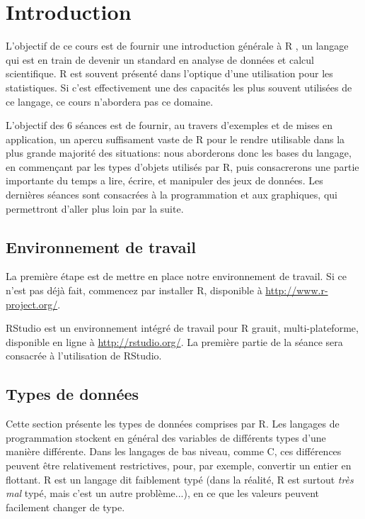 \chapter{Introduction}

L'objectif de ce cours est de fournir une introduction générale à R \parencite{R-Development-Core-Team2008}, un langage qui est en train de devenir un standard en analyse de données et calcul scientifique.
R est souvent présenté dans l'optique d'une utilisation pour les statistiques.
Si c'est effectivement une des capacités les plus souvent utilisées de ce langage, ce cours n'abordera pas ce domaine.

L'objectif des 6 séances est de fournir, au travers d'exemples et de mises en application, un apercu suffisament vaste de R pour le rendre utilisable dans la plus grande majorité des situations:
nous aborderons donc les bases du langage, en commençant par les types d'objets utilisés par R, puis consacrerons une partie importante du temps a lire, écrire, et manipuler des jeux de données.
Les dernières séances sont consacrées à la programmation et aux graphiques, qui permettront d'aller plus loin par la suite.

\section{Environnement de travail}

La première étape est de mettre en place notre environnement de travail. Si ce n'est pas déjà fait, commencez par installer R, disponible à \url{http://www.r-project.org/}.

RStudio est un environnement intégré de travail pour R grauit, multi-plateforme, disponible en ligne à \url{http://rstudio.org/}.
La première partie de la séance sera consacrée à l'utilisation de RStudio.  

\section{Types de données}

Cette section présente les types de données comprises par R.
Les langages de programmation stockent en général des variables de différents types d'une manière différente.
Dans les langages de bas niveau, comme C, ces différences peuvent être relativement restrictives, pour, par exemple, convertir un entier en flottant.
R est un langage dit faiblement typé (dans la réalité, R est surtout \emph{très mal} typé, mais c'est un autre problème...), en ce que les valeurs peuvent facilement changer de type.


